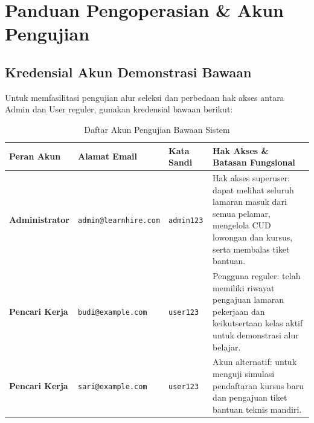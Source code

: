 \documentclass[11pt,a4paper]{article}
\begin{document}
\newpage

\section{Panduan Pengoperasian \& Akun Pengujian}

\subsection{Kredensial Akun Demonstrasi Bawaan}
Untuk memfasilitasi pengujian alur seleksi dan perbedaan hak akses antara Admin dan User reguler, gunakan kredensial bawaan berikut:

\begin{table}[h!]
\centering
\small
\begin{tabular}{p{2.8cm} p{4.2cm} p{2.2cm} p{6.4cm}}
\toprule
\textbf{Peran Akun} & \textbf{Alamat Email} & \textbf{Kata Sandi} & \textbf{Hak Akses \& Batasan Fungsional} \\
\midrule
\textbf{Administrator} & \texttt{admin@learnhire.com} & \texttt{admin123} & Hak akses superuser: dapat melihat seluruh lamaran masuk dari semua pelamar, mengelola CUD lowongan dan kursus, serta membalas tiket bantuan. \\
\addlinespace
\textbf{Pencari Kerja} & \texttt{budi@example.com} & \texttt{user123} & Pengguna reguler: telah memiliki riwayat pengajuan lamaran pekerjaan dan keikutsertaan kelas aktif untuk demonstrasi alur belajar. \\
\addlinespace
\textbf{Pencari Kerja} & \texttt{sari@example.com} & \texttt{user123} & Akun alternatif: untuk menguji simulasi pendaftaran kursus baru dan pengajuan tiket bantuan teknis mandiri. \\
\bottomrule
\end{tabular}
\caption{Daftar Akun Pengujian Bawaan Sistem}
\end{table}
\end{document}
